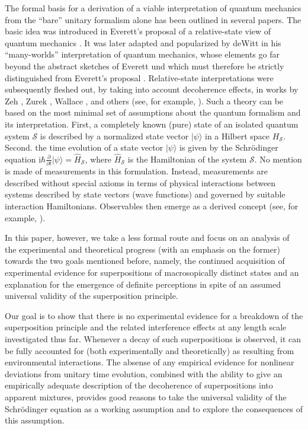 \documentclass[twocolumn,aps,floatfix,amsmath,amssymb,showpacs,nofootinbib]{revtex4}
\newcommand{\ket}[1]{\ensuremath{|{#1\rangle}}}
\begin{document}
The formal basis for a derivation of a viable interpretation of
quantum mechanics from the ``bare'' unitary formalism alone has been
outlined in several papers. The basic idea was introduced in Everett's
proposal of a relative-state view of quantum mechanics
\cite{Everett:1957:rw}. It was later adapted and popularized by deWitt
\cite{DeWitt:1970:pl,DeWitt:1971:pz,DeWitt:1973:pz} in his
``many-worlds'' interpretation of quantum mechanics, whose elements go
far beyond the abstract sketches of Everett und which must therefore
be strictly distinguished from Everett's proposal \cite{Kent:1990:nm}.
Relative-state interpretations were subsequently fleshed out, by
taking into account decoherence effects, in works by Zeh
\cite{Zeh:1970:yt,Zeh:1973:wq,Zeh:2000:rr}, Zurek
\cite{Zurek:1998:re,Zurek:2002:ii,Zurek:2004:yb}, Wallace
\cite{Wallace:2003:iz,Wallace:2003:iq}, and others (see, for example,
\cite{Deutsch:1985:rx,Vaidmain:1998:zp,Donald:1999:yb}). Such a theory
can be based on the most minimal set of assumptions about the quantum
formalism and its interpretation.  First, a completely known (pure)
state of an isolated quantum system $\mathcal{S}$ is described by a
normalized state vector $\ket{\psi}$ in a Hilbert space
$H_\mathcal{S}$. Second.  the time evolution of a state vector
$\ket{\psi}$ is given by the Schr\"odinger equation $\mathrm{i}\hbar
\frac{\partial}{\partial t} \ket{\psi} = \widehat{H}_\mathcal{S}$,
where $\widehat{H}_\mathcal{S}$ is the Hamiltonian of the system
$\mathcal{S}$. No mention is made of measurements in this formulation.
Instead, measurements are described without special axioms in terms of
physical interactions between systems described by state vectors (wave
functions) and governed by suitable interaction Hamiltonians.
Observables then emerge as a derived concept
(see, for example, \cite{Joos:2003:jh,Zurek:2002:ii}).

In this paper, however, we take a less formal route and focus on an
analysis of the experimental and theoretical progress (with an
emphasis on the former) towards the two goals mentioned before,
namely, the continued acquisition of experimental evidence for
superpositions of macrosopically distinct states and an explanation
for the emergence of definite perceptions in spite of an assumed
universal validity of the superposition principle.

Our goal is to show that there is no experimental evidence for a
breakdown of the superposition principle and the related interference
effects at any length scale investigated thus far.  Whenever a decay
of such superpositions is observed, it can be fully accounted for
(both experimentally and theoretically) as resulting from
environmental interactions. The absense of any empirical evidence for
nonlinear deviations from unitary time evolution, combined with the
ability to give an empirically adequate description of the decoherence
of superpositions into apparent mixtures, provides good reasons to
take the universal validity of the Schr\"odinger equation as a working
assumption and to explore the consequences of this assumption.
\end{document}
